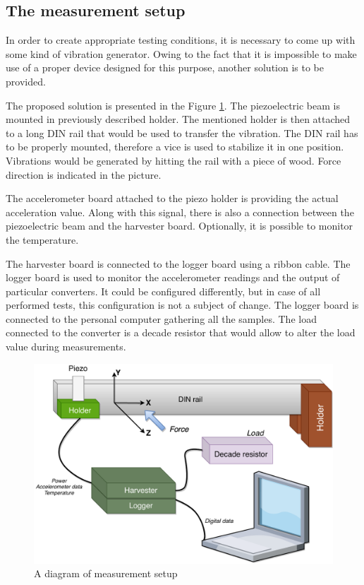 \documentclass[12pt,a4paper]{article}
\begin{document}
\subsection{The measurement setup}
In order to create appropriate testing conditions, it is necessary to come up with some kind of vibration generator. Owing to the fact that it is impossible to make use of a proper device designed for this purpose, another solution is to be provided.
\par
The proposed solution is presented in the Figure \ref{fig:setup}. The piezoelectric beam is mounted in previously described holder. The mentioned holder is then attached to a long DIN rail that would be used to transfer the vibration. The DIN rail has to be properly mounted, therefore a vice is used to stabilize it in one position. Vibrations would be generated by hitting the rail with a piece of wood. Force direction is indicated in the picture.
\par

The accelerometer board attached to the piezo holder is providing the actual acceleration value. Along with this signal, there is also a connection between the piezoelectric beam and the harvester board. Optionally, it is possible to monitor the temperature.
\par

The harvester board is connected to the logger board using a ribbon cable. The logger board is used to monitor the accelerometer readings and the output of particular converters. It could be configured differently, but in case of all performed tests, this configuration is not a subject of change. The logger board is connected to the personal computer gathering all the samples. The load connected to the converter is a decade resistor that would allow to alter the load value during measurements.

\begin{figure}[ht!]
\includegraphics[scale=0.6]{setup.pdf}
\caption{A diagram of measurement setup}
\label{fig:setup}
\end{figure}
\par
\end{document}
